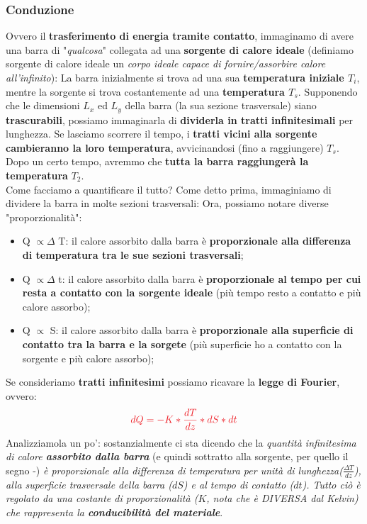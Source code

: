         \subsubsection{Conduzione}
            Ovvero il \textbf{trasferimento di energia tramite contatto}, immaginamo di avere una barra di "\textit{qualcosa}" collegata ad una \textbf{sorgente di calore ideale} (definiamo sorgente di calore ideale un \textit{corpo ideale capace di fornire/assorbire calore all'infinito}):
            La barra inizialmente si trova ad una sua \textbf{temperatura iniziale $T_i$}, mentre la sorgente si trova costantemente ad una \textbf{temperatura $T_s$}. Supponendo che le dimensioni $L_x$ ed $L_y$ della barra (la sua sezione trasversale) siano \textbf{trascurabili}, possiamo immaginarla di \textbf{dividerla in tratti infinitesimali} per lunghezza. Se lasciamo scorrere il tempo, i \textbf{tratti vicini alla sorgente cambieranno la loro temperatura}, avvicinandosi (fino a raggiungere) $T_s$. Dopo un certo tempo, avremmo che \textbf{tutta la barra raggiungerà la temperatura} $T_2$.\\

            Come facciamo a quantificare il tutto? Come detto prima, immaginiamo di dividere la barra in molte sezioni trasversali:
            Ora, possiamo notare diverse "proporzionalità":
            \begin{itemize}
                \item Q $\propto \Delta$ T: il calore assorbito dalla barra è \textbf{proporzionale alla differenza di temperatura tra le sue sezioni trasversali};
                \item Q $\propto \Delta$ t: il calore assorbito dalla barra è \textbf{proporzionale al tempo per cui resta a contatto con la sorgente ideale} (più tempo resto a contatto e più calore assorbo);
                \item Q $\propto$ S: il calore assorbito dalla barra è \textbf{proporzionale alla superficie di contatto tra la barra e la sorgete} (più superficie ho a contatto con la sorgente e più calore assorbo);
            \end{itemize}
            Se consideriamo \textbf{tratti infinitesimi} possiamo ricavare la \textbf{legge di Fourier}, ovvero:
            \begin{align*}
                \textcolor{Red}{dQ=-K*\frac{dT}{dz}*dS*dt}
            \end{align*}
            Analizziamola un po': sostanzialmente ci sta dicendo che la \textit{quantità infinitesima di calore \textbf{assorbito dalla barra}} (e quindi sottratto alla sorgente, per quello il segno -) \textit{è proporzionale alla differenza di temperatura per unità di lunghezza($\frac{\Delta T}{dz}$), alla superficie trasversale della barra ($dS$) e al tempo di contatto ($dt$). Tutto ciò è regolato da una costante di proporzionalità ($K$, nota che è DIVERSA dal Kelvin) che rappresenta la \textbf{conducibilità del materiale}}.

